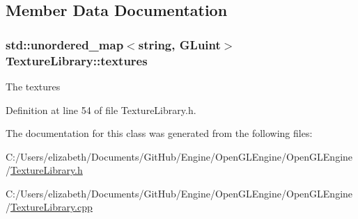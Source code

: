 \subsection{Member Data Documentation}
\subsubsection[{\texorpdfstring{textures}{textures}}]{\setlength{\rightskip}{0pt plus 5cm}std\+::unordered\+\_\+map$<${\bf string}, G\+Luint$>$ Texture\+Library\+::textures\hspace{0.3cm}{\ttfamily [private]}}\hypertarget{class_texture_library_a9410551a89d1b90cb86453da44dbd704}{}\label{class_texture_library_a9410551a89d1b90cb86453da44dbd704}


The textures 



Definition at line 54 of file Texture\+Library.\+h.



The documentation for this class was generated from the following files\+:\begin{DoxyCompactItemize}
\item 
C\+:/\+Users/elizabeth/\+Documents/\+Git\+Hub/\+Engine/\+Open\+G\+L\+Engine/\+Open\+G\+L\+Engine/\hyperlink{_texture_library_8h}{Texture\+Library.\+h}\item 
C\+:/\+Users/elizabeth/\+Documents/\+Git\+Hub/\+Engine/\+Open\+G\+L\+Engine/\+Open\+G\+L\+Engine/\hyperlink{_texture_library_8cpp}{Texture\+Library.\+cpp}\end{DoxyCompactItemize}
